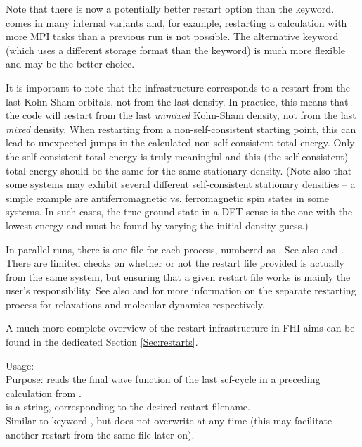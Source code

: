 Note that there is now a potentially better restart option than the
 keyword.  comes in many internal
variants and, for example, restarting a calculation with more MPI
tasks than a previous run is not possible. The alternative
 keyword (which uses a different storage format
than the  keyword) is much more flexible and may be
the better choice.

It is important to note that the  infrastructure
corresponds to a restart from the last Kohn-Sham orbitals, not from
the last density. In practice, this means that the code will restart
from the last \emph{unmixed} Kohn-Sham density, not from the last
\emph{mixed} density. When restarting from a non-self-consistent
starting point, this can lead to unexpected jumps in the calculated
non-self-consistent total energy. Only the
self-consistent total energy is truly meaningful and this (the
self-consistent) total energy should be the same for the same
stationary density. (Note also that some systems may exhibit several
different self-consistent stationary densities -- a simple example are
antiferromagnetic vs. ferromagnetic spin states in some systems. In
such cases, the true ground state in a DFT sense is the one with the
lowest energy and must be found by varying the initial density guess.)

In parallel runs, there is one file for each process, numbered
as . See also 
and . There are limited checks on
whether or not the restart file provided is actually from the same
system, but ensuring that a given restart file works is mainly the
user's responsibility. See also 
and  for more information on the separate restarting process for
relaxations and molecular dynamics respectively.

A much more complete overview of the restart infrastructure in FHI-aims
can be found in the dedicated Section \ref{Sec:restarts}.

{
  \noindent
  Usage:   \\[1.0ex]
  Purpose: reads the final wave function of the last scf-cycle in a
    preceding calculation from .\\[1.0ex]
   is a string, corresponding to the desired restart
  filename. \\
}
Similar to keyword , but does not overwrite
 at any time (this may facilitate another restart from
the same file later on).

